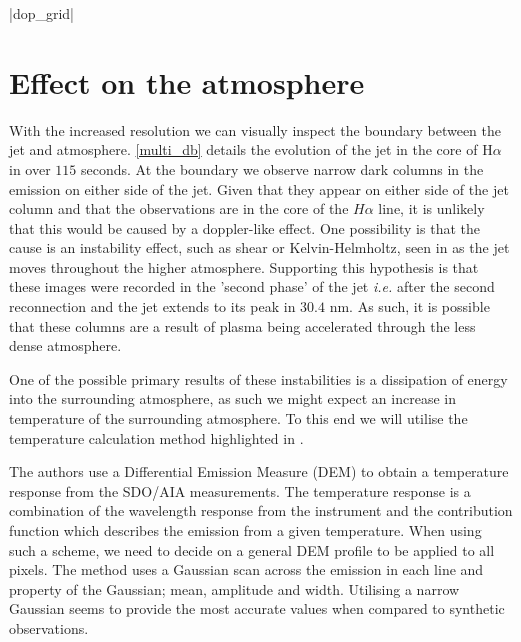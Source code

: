 \documentclass{emulateapj}
\begin{document}
\py[DOPPLER]|dop_grid|





\section{Effect on the atmosphere}
\label{temp_map_sect}

With the increased resolution we can visually inspect the boundary between the jet and atmosphere.
\cref{multi_db} details the evolution of the jet in the core of H$\alpha$ in over $115$ seconds.
At the boundary we observe narrow dark columns in the emission on either side of the jet.
Given that they appear on either side of the jet column and that the observations are in the core of the $H\alpha$ line, it is unlikely that this would be caused by a doppler-like effect.
One possibility is that the cause is an instability effect, such as shear or Kelvin-Helmholtz, seen in \cite{Zaqarashvili2014} as the jet moves throughout the higher atmosphere.
Supporting this hypothesis is that these images were recorded in the 'second phase' of the jet \emph{i.e.} after the second reconnection and the jet extends to its peak in $30.4$ nm. 
As such, it is possible that these columns are a result of plasma being accelerated through the less dense atmosphere.

One of the possible primary results of these instabilities is a dissipation of energy into the surrounding atmosphere, as such we might expect an increase in temperature of the surrounding atmosphere.
To this end we will utilise the temperature calculation method highlighted in \cite{Leonard2014}.

The authors use a Differential Emission Measure (DEM) to obtain a temperature response from the SDO/AIA measurements.
The temperature response is a combination of the wavelength response from the instrument and the contribution function which describes the emission from a given temperature.
When using such a scheme, we need to decide on a general DEM profile to be applied to all pixels.
The method uses a Gaussian scan across the emission in each line and property of the Gaussian; mean, amplitude and width. 
Utilising a narrow Gaussian seems to provide the most accurate values when compared to synthetic observations.
\end{document}
